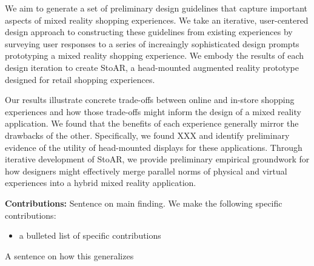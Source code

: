 

We aim to generate a set of preliminary design guidelines that capture important aspects of mixed reality shopping experiences. We take an iterative, user-centered design approach to constructing these guidelines from existing experiences by surveying user responses to a series of increaingly sophisticated design prompts prototyping a mixed reality shopping experience.   We embody the results of each design iteration to create StoAR, a head-mounted augmented reality prototype designed for retail shopping experiences.

Our results illustrate concrete trade-offs between online and in-store shopping experiences and how those trade-offs might inform the design of a mixed reality application. We found that the benefits of each experience generally mirror the drawbacks of the other.  Specifically, we found XXX and identify preliminary evidence of the utility of head-mounted displays for these applications. Through iterative development of StoAR, we provide preliminary empirical groundwork for how designers might effectively merge parallel norms of physical and virtual experiences into a hybrid mixed reality application. 

\noindent\textbf{Contributions:} Sentence on main finding. We make the following specific contributions:
\begin{itemize}
	\item a bulleted list of specific contributions
\end{itemize}
A sentence on how this generalizes


